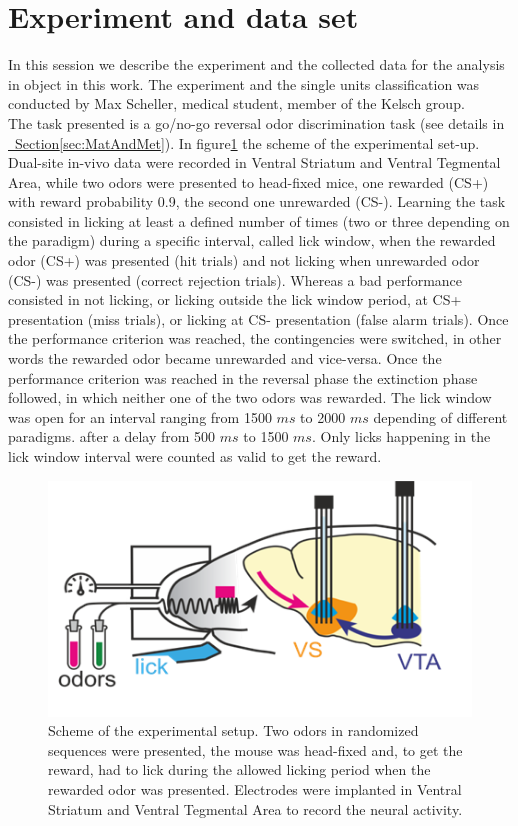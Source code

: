 \section{Experiment and data set}
\label{sec:Dataset}
In this session we describe the experiment and the collected data for the analysis in object in this work. The experiment and the single units classification was conducted by Max Scheller, medical student, member of the Kelsch group.\\
The task presented is a go/no-go reversal odor discrimination task (see details in \hyperref[sec:MatAndMet]{~Section\ref*{sec:MatAndMet}}). In figure\ref{fig:experiment} the scheme of the experimental set-up. Dual-site in-vivo data were recorded in Ventral Striatum and Ventral Tegmental Area, while two odors were presented to head-fixed mice, one rewarded (CS+) with reward probability 0.9, the second one unrewarded (CS-). Learning the task consisted in licking at least a defined number of times (two or three depending on the paradigm) during a specific interval, called lick window, when the rewarded odor (CS+) was presented (hit trials) and not licking when unrewarded odor (CS-) was presented (correct rejection trials). Whereas a bad performance consisted in not licking, or licking outside the lick window period, at CS+ presentation (miss trials), or licking at CS- presentation (false alarm trials). Once the performance criterion was reached, the contingencies were switched, in other words the rewarded odor became unrewarded and vice-versa. Once the performance criterion was reached in the reversal phase the extinction phase followed, in which neither one of the two odors was rewarded. The lick window was open for an interval ranging from 1500 $ms$ to 2000 $ms$ depending of different paradigms. after a delay from 500 $ms$ to 1500 $ms$. Only licks happening in the lick window interval were counted as valid to get the reward.\\
\begin{figure}
    \centering
    \includegraphics[scale=1]{figures/Experiment.png}
    \caption{Scheme of the experimental setup. Two odors in randomized sequences were presented, the mouse was head-fixed and, to get the reward, had to lick during the allowed licking period when the rewarded odor was presented. Electrodes were implanted in Ventral Striatum and Ventral Tegmental Area to record the neural activity. }
    \label{fig:experiment}
\end{figure}

